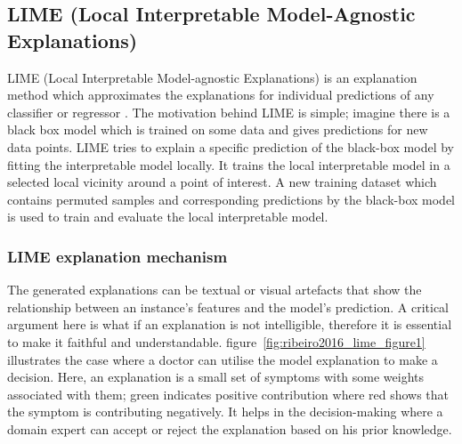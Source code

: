 \documentclass[english]{tktltiki2}
\theoremstyle{definition}
\theoremstyle{remark}
\begin{document}
\subsection{ LIME (Local Interpretable Model-Agnostic Explanations)}\label{sec:LIME} %
LIME (Local Interpretable Model-agnostic Explanations) is an explanation method which approximates the explanations for individual predictions of any classifier or regressor \citep{ribeiro2016should}. The motivation behind LIME is simple; imagine there is a black box model which is trained on some data and gives predictions for new data points. LIME tries to explain a specific prediction of the black-box model by fitting the interpretable model locally. It trains the local interpretable model in a selected local vicinity around a point of interest. A new training dataset which contains permuted samples and corresponding predictions by the black-box model is used to train and evaluate the local interpretable model. 

\subsubsection{LIME explanation mechanism} %
The generated explanations can be textual or visual artefacts that show the relationship between an instance's features and the model's prediction. A critical argument here is what if an explanation is not intelligible, therefore it is essential to make it faithful and understandable. figure~\ref{fig:ribeiro2016_lime_figure1} illustrates the case where a doctor can utilise the model explanation to make a decision. Here, an explanation is a small set of symptoms with some weights associated with them; green indicates positive contribution where red shows that the symptom is contributing negatively. It helps in the decision-making where a domain expert can accept or reject the explanation based on his prior knowledge.
\end{document}
